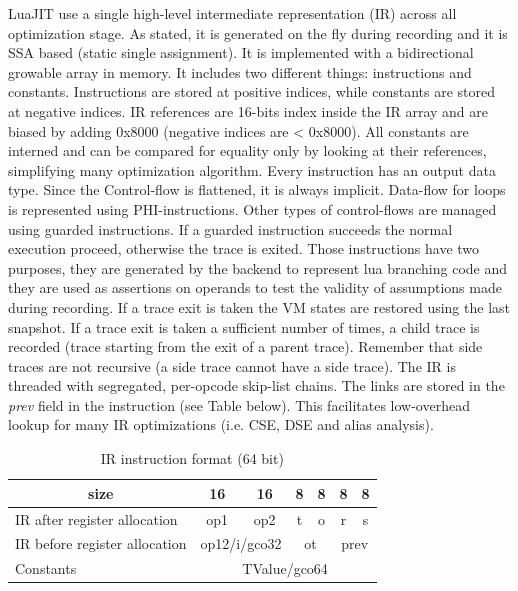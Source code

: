 LuaJIT use a single high-level intermediate representation (IR) across all
optimization stage. As stated, it is generated on the fly during recording and
it is SSA based (static single assignment). It is implemented with a
bidirectional growable array in memory. It includes two different things:
instructions and constants. Instructions are stored at positive indices, while
constants are stored at negative indices. IR references are 16-bits index inside
the IR array and are biased by adding 0x8000 (negative indices are < 0x8000).
All constants are interned and can be compared for equality only by looking at
their references, simplifying many optimization algorithm. Every instruction has
an output data type. Since the Control-flow is flattened, it is always implicit.
Data-flow for loops is represented using PHI-instructions. Other types of
control-flows are managed using guarded instructions. If a guarded instruction
succeeds the normal execution proceed, otherwise the trace is exited. Those
instructions have two purposes, they are generated by the backend to represent
lua branching code and they are used as assertions on operands to test the
validity of assumptions made during recording. If a trace exit is taken the VM
states are restored using the last snapshot. If a trace exit is taken a
sufficient number of times, a child trace is recorded
(trace starting from the exit of a parent trace). Remember that side traces are
not recursive (a side trace cannot have a side trace). The IR is threaded with
segregated, per-opcode skip-list chains. The links are stored in the \emph{prev}
field in the instruction (see Table below). This facilitates low-overhead
lookup for many IR optimizations (i.e. CSE, DSE and alias analysis).

\begin{table}[H]
\centering
\caption{IR instruction format (64 bit)}
\label{tab:ir-format}
\begin{tabular}{|l|c|c|c|c|c|c|}
\hline
\multicolumn{1}{|c|}{size}    & 16              & 16              & 8          & 8          & 8           & 8           \\ \hline
IR after register allocation  & op1             & op2             & t          & o          & r           & s           \\ \hline
IR before register allocation & \multicolumn{2}{c|}{op12/i/gco32} & \multicolumn{2}{c|}{ot} & \multicolumn{2}{c|}{prev} \\ \hline
Constants                     & \multicolumn{6}{c|}{TValue/gco64}                                                       \\ \hline
\end{tabular}
\end{table}

